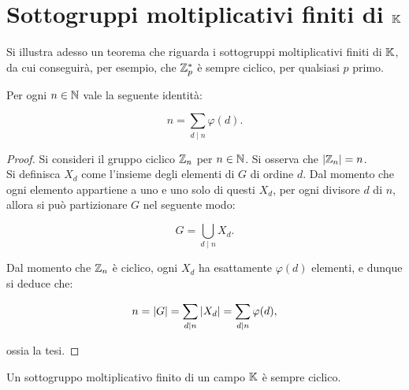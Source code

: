 \documentclass[11pt]{scrbook}
\begin{document}
\section{Sottogruppi moltiplicativi finiti di \texorpdfstring{$\mathbb{K}$}{K}}

Si illustra adesso un teorema che riguarda i sottogruppi
moltiplicativi finiti di $\mathbb{K}$, da cui conseguirà,
per esempio, che $\mathbb Z_p^*$ è sempre ciclico, per
qualsiasi $p$ primo. \\

\begin{lemma}
    \label{lem:somma_phi_n}
    Per ogni $n \in \mathbb N$ vale la seguente identità:

    \[ n = \sum_{d \mid n} \varphi(d). \]
\end{lemma}

\begin{proof}
    Si consideri il gruppo ciclico $\mathbb Z_n$ per $n \in \mathbb N$.
    Si osserva che $\left|\mathbb Z_n\right| = n$. \\

    Si definisca $X_d$ come l'insieme degli elementi di $G$
    di ordine $d$. Dal momento che ogni elemento appartiene
    a uno e uno solo di questi $X_d$, per ogni divisore
    $d$ di $n$, allora si può partizionare $G$ nel
    seguente modo:

    \begin{equation*}
        G = \bigcup_{d \mid n} X_d.
    \end{equation*}

    Dal momento che $\mathbb Z_n$ è ciclico, ogni $X_d$ ha esattamente
    $\varphi(d)$ elementi, e dunque si deduce che:

    \begin{equation*}
        n = \left|G\right| = \sum_{d \mid n} \left|X_d\right| =  \sum_{d \mid n} \varphi(d),
    \end{equation*}

    ossia la tesi.
\end{proof}

\begin{theorem}
    Un sottogruppo moltiplicativo finito di un campo
    $\mathbb{K}$ è sempre ciclico.
\end{theorem}
\end{document}
